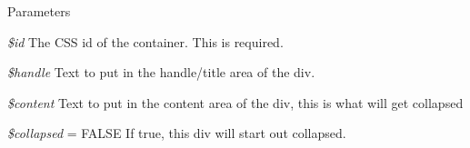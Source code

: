 \begin{DoxyParams}{Parameters}
\item[{\em \$id}]The CSS id of the container. This is required. \item[{\em \$handle}]Text to put in the handle/title area of the div. \item[{\em \$content}]Text to put in the content area of the div, this is what will get collapsed \item[{\em \$collapsed}]= FALSE If true, this div will start out collapsed. \end{DoxyParams}
